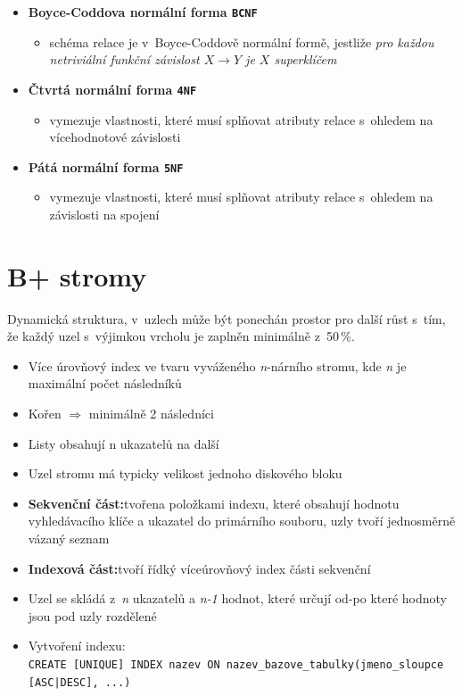 \documentclass[a4paper,10pt]{article}
\newcommand{\pojem}[2]{\item \textbf{#1:}\quad #2}
\newcommand{\tedy}{$\Rightarrow$ }
\begin{document}
\begin{itemize}
        \item \textbf{Boyce-Coddova normální forma \texttt{BCNF}}
        \begin{itemize}
          \item schéma relace je v~Boyce-Coddově normální formě, jestliže \emph{pro každou netriviální funkční závislost $X \rightarrow Y$ je $X$ superklíčem}
        \end{itemize}

        \item \textbf{Čtvrtá normální forma \texttt{4NF}}
        \begin{itemize}
          \item vymezuje vlastnosti, které musí splňovat atributy relace s~ohledem na vícehodnotové závislosti
        \end{itemize}

        \item \textbf{Pátá normální forma \texttt{5NF}}
        \begin{itemize}
          \item vymezuje vlastnosti, které musí splňovat atributy relace s~ohledem na závislosti na spojení
        \end{itemize}
      \end{itemize}

  \section{B+ stromy}
  Dynamická struktura, v~uzlech může být ponechán prostor pro další růst s~tím, že každý uzel s~výjimkou vrcholu je zaplněn minimálně z~50\,\%.
  \begin{itemize}
    \item Více úrovňový index ve tvaru vyváženého \textit{n}-nárního stromu, kde \textit{n} je maximální počet následníků
    \item Kořen \tedy minimálně 2 následníci
    \item Listy obsahují n ukazatelů na další
    \item Uzel stromu má typicky velikost jednoho diskového bloku
    \pojem{Sekvenční část}{tvořena položkami indexu, které obsahují hodnotu vyhledávacího klíče a ukazatel do primárního souboru, uzly tvoří jednosměrně vázaný seznam}
    \pojem{Indexová část}{tvoří řídký víceúrovňový index části sekvenční}
  \item Uzel se skládá z~\textit{n} ukazatelů a \textit{n-1} hodnot, které určují od-po které hodnoty jsou pod uzly rozdělené
    \item Vytvoření indexu: \\ \texttt{CREATE [UNIQUE] INDEX nazev ON nazev\_bazove\_tabulky(jmeno\_sloupce [ASC|DESC], ...)}
  \end{itemize}
\end{document}
